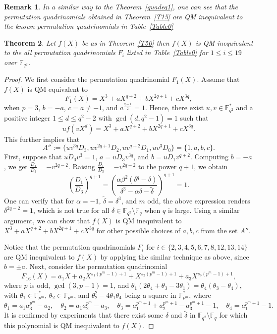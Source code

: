 \documentclass[12pt]{amsart}
\newtheorem{thm}{Theorem}[section]
\newtheorem{rmk}[thm]{Remark}
\numberwithin{equation}{section}
\theoremstyle{definition}
\newcommand{\F}{\mathbb F}
\begin{document}
  
\begin{rmk}
 In a similar way to the Theorem~\ref{quadeq1}, one can see that the permutation quadrinomials obtained in Theorem~\ref{T15} are  QM inequivalent to the known permutation quadrinomials in Table~\ref{Table0}
\end{rmk}

%  
\begin{thm}\label{quadeq2}
 Let $f(X)$ be as in Theorem~\ref{T50} then $f(X)$ is QM inequivalent to the all permutation quadrinomials $F_i$ listed in Table~\ref{Table0} for $1 \leq i \leq 19$ over $\F_{q^2}$.
\end{thm}
\begin{proof}
 We first consider the permutation quadrinomial $F_1(X)$. Assume that \( f(X) \) is QM equivalent to  
\[
F_1(X)=X^3 + aX^{q+2} + bX^{2q+1} + cX^{3q},
\]  
when \( p = 3 \), \( b = -a \), \( c = a \neq -1 \), and \( a^{\frac{q-1}{2}} = 1 \). Hence, there exist \( u, v \in \mathbb{F}_{q^2}^{*} \) and a positive integer \( 1 \leq d \leq q^2-2 \) with \( \gcd(d, q^2-1) = 1 \) such that  
\[
uf(vX^d) = X^3 + aX^{q+2} + bX^{2q+1} + cX^{3q}.
\]
This further implies that  
\[
A'' := \{uv^{3q}D_3, uv^{2q+1}D_2, uv^{q+2}D_1, uv^3 D_0\} = \{1, a, b, c\}.
\]
First, suppose that \( uD_0 v^3 = 1 \), \( a = uD_3 v^{3q} \), and \( b = uD_1 v^{q+2} \). Computing \( b = -a \), we get \( \frac{D_1}{D_3} = -v^{2q-2} \). Raising \( \frac{D_1}{D_3} = -v^{2q-2} \) to the power \( q+1 \), we obtain  
\[
\left(\frac{D_1}{D_3}\right)^{q+1} = \left(\frac{\alpha \beta^2 (\delta^q - \delta)}{\delta^3 - \alpha\delta - \tilde{\delta}}\right)^{q+1} = 1.
\]
One can verify that for \( \alpha = -1 \), \( \tilde{\delta} = \delta^3 \), and \( m \) odd, the above expression renders \( \delta^{2q-2} = 1 \), which is not true for all \( \delta \in \mathbb{F}_{q^2} \setminus \mathbb{F}_{q} \) when \( q \) is large. Using a similar argument, we can show that \( f(X) \) is QM inequivalent to  
\(
X^3 + aX^{q+2} + bX^{2q+1} + cX^{3q}
\)
for other possible choices of \( a, b, c \) from the set \( A'' \).  

Notice that the permutation quadrinomials $F_i$ for $i \in \{2,3,4,5,6,7,8,12,13,14 \}$ are QM inequivalent to \( f(X) \) by applying the similar technique as above, since \( b = \pm a \). Next, consider the permutation quadrinomial  
\[
F_{16}(X)=a_1X + a_2X^{s_1(p^m-1)+1} + X^{s_2(p^m-1)+1} + a_3X^{s_3(p^m-1)+1},
\]
where \( p \) is odd, \( \gcd(3, p-1) = 1 \), and  
\(
\theta_1(2\theta_4 + \theta_3 - 3\theta_1) = \theta_4(\theta_3 - \theta_4),
\)
with \( \theta_1 \in \mathbb{F}_{p^m}^{*} \), \( \theta_2 \in \mathbb{F}_{p^m} \), and \( \theta_2^2 - 4\theta_1\theta_4 \) being a square in \( \mathbb{F}_{p^m}^{*} \), where  
\(
\theta_1 = a_1a_3^{p^m} - a_2, \quad \theta_2 = a_1a_2^{p^m} - a_3, \quad \theta_3 = a_1^{p^m+1} + a_2^{p^m+1} - a_3^{p^m+1} - 1, \quad \theta_4 = a_1^{p^m+1} - 1.
\)
It is confirmed by experiments that there exist some \( \delta \) and \( \tilde{\delta} \) in \( \mathbb{F}_{q^2} \setminus \mathbb{F}_q \) for which this polynomial is QM inequivalent to \( f(X) \).  


\end{proof}
\end{document}
